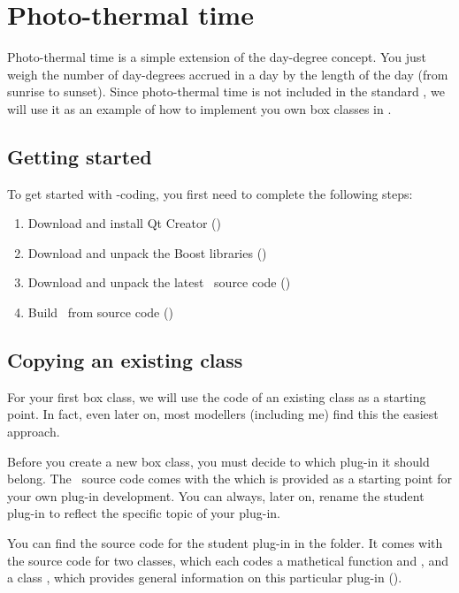 \section {Photo-thermal time}
Photo-thermal time is a simple extension of the day-degree concept. You just weigh the  number of day-degrees accrued in a day by the length of the day (from sunrise to sunset). Since photo-thermal time is not included in the standard \US, we will use it as an example of how to implement you own box classes in \US.

\subsection {Getting started}
To get started with \CPP-coding, you first need to complete the following steps:
\begin{enumerate}
\item Download and install Qt Creator ()
\item Download and unpack the Boost libraries ()
\item Download and unpack the latest \US\ source code ()
\item Build \US\ from source code ()
\end{enumerate}

\subsection {Copying an existing class}
For your first box class, we will use the code of an existing class as a starting point. In fact, even later on, most modellers (including me) find this the easiest approach.

Before you create a new box class, you must decide to which plug-in it should belong. The \US\ source code comes with the  which is provided as a starting point for your own plug-in development. You can always, later on, rename the student plug-in to reflect the specific topic of your plug-in.

You can find the source code for the student plug-in in the  folder. It comes with the source code for two classes, which each codes a mathetical function  and , and a class , which provides general information on this particular plug-in ().

